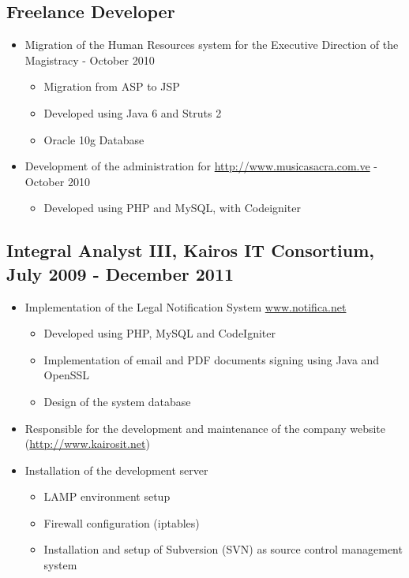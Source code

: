 \documentclass[letterpaper,11pt]{report}
\begin{document}
\subsection*{Freelance Developer}
\begin{itemize}
\item Migration of the Human Resources system for the Executive Direction of the Magistracy - October 2010
	\begin{itemize}
	\item Migration from ASP to JSP
	\item Developed using Java 6 and Struts 2
	\item Oracle 10g Database
	\end{itemize}
\item Development of the administration for \url{http://www.musicasacra.com.ve} - October 2010
	\begin{itemize}
		\item Developed using PHP and MySQL, with Codeigniter
	\end{itemize}
\end{itemize}

\subsection*{Integral Analyst III, Kairos IT Consortium, July 2009 - December 2011}

\begin{itemize}
\item
  Implementation of the Legal Notification System \url{www.notifica.net}
  \begin{itemize}
  \item Developed using PHP, MySQL and CodeIgniter
  \item Implementation of email and PDF documents signing using Java and OpenSSL
  \item Design of the system database
  \end{itemize}
\item Responsible for the development and maintenance of the company website (\url{http://www.kairosit.net})
\item Installation of the development server
  \begin{itemize}
  \item LAMP environment setup
  \item Firewall configuration (iptables)
  \item Installation and setup of Subversion (SVN) as source control management system
  \end{itemize}
\end{itemize}
\end{document}
